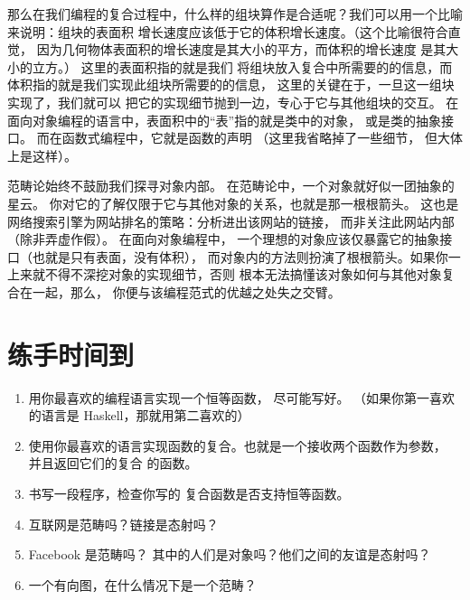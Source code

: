 那么在我们编程的复合过程中，什么样的组块算作是合适呢？我们可以用一个比喻来说明：组块的表面积
增长速度应该低于它的体积增长速度。（这个比喻很符合直觉，
因为几何物体表面积的增长速度是其大小的平方，而体积的增长速度
是其大小的立方。）
这里的表面积指的就是我们
将组块放入复合中所需要的的信息，而体积指的就是我们实现此组块所需要的的信息，
这里的关键在于，一旦这一组块实现了，我们就可以
把它的实现细节抛到一边，专心于它与其他组块的交互。
在面向对象编程的语言中，表面积中的“表”指的就是类中的对象，
或是类的抽象接口。
而在函数式编程中，它就是函数的声明
（这里我省略掉了一些细节，
但大体上是这样）。

范畴论始终不鼓励我们探寻对象内部。
在范畴论中，一个对象就好似一团抽象的星云。
你对它的了解仅限于它与其他对象的关系，也就是那一根根箭头。
这也是网络搜索引擎为网站排名的策略：分析进出该网站的链接，
而非关注此网站内部（除非弄虚作假）。
在面向对象编程中，
一个理想的对象应该仅暴露它的抽象接口（也就是只有表面，没有体积），
而对象内的方法则扮演了根根箭头。如果你一上来就不得不深挖对象的实现细节，否则
根本无法搞懂该对象如何与其他对象复合在一起，那么，
你便与该编程范式的优越之处失之交臂。


\section{练手时间到}

\begin{enumerate}
  \tightlist
  \item
        用你最喜欢的编程语言实现一个恒等函数，
        尽可能写好。
        （如果你第一喜欢的语言是 Haskell，那就用第二喜欢的）
  \item
        使用你最喜欢的语言实现函数的复合。也就是一个接收两个函数作为参数，
        并且返回它们的复合
        的函数。
  \item
        书写一段程序，检查你写的
        复合函数是否支持恒等函数。
  \item
        互联网是范畴吗？链接是态射吗？
  \item
        Facebook 是范畴吗？
        其中的人们是对象吗？他们之间的友谊是态射吗？
  \item
        一个有向图，在什么情况下是一个范畴？
\end{enumerate}